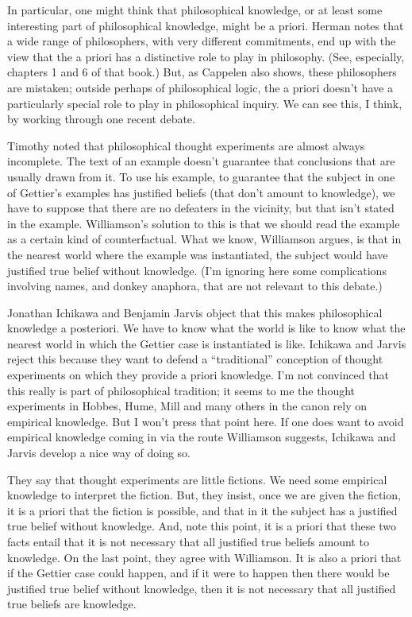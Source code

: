 In particular, one might think that philosophical knowledge, or at least some interesting part of philosophical knowledge, might be a priori. Herman  \citet{Cappelen2012} notes that a wide range of philosophers, with very different commitments, end up with the view that the a priori has a distinctive role to play in philosophy. (See, especially, chapters 1 and 6 of that book.) But, as Cappelen also shows, these philosophers are mistaken; outside perhaps of philosophical logic, the a priori doesn't have a particularly special role to play in philosophical inquiry. We can see this, I think, by working through one recent debate.

Timothy  \citet{Williamson2007-WILTPO-17} noted that philosophical thought experiments are almost always incomplete. The text of an example doesn't guarantee that conclusions that are usually drawn from it. To use his example, to guarantee that the subject in one of Gettier's examples has justified beliefs (that don't amount to knowledge), we have to suppose that there are no defeaters in the vicinity, but that isn't stated in the example. Williamson's solution to this is that we should read the example as a certain kind of counterfactual. What we know, Williamson argues, is that in the nearest world where the example was instantiated, the subject would have justified true belief without knowledge. (I'm ignoring here some complications involving names, and donkey anaphora, that are not relevant to this debate.)

Jonathan Ichikawa and Benjamin Jarvis  \citeyearpar{IchikawaJarvis2009} object that this makes philosophical knowledge a posteriori. We have to know what the world is like to know what the nearest world in which the Gettier case is instantiated is like. Ichikawa and Jarvis reject this because they want to defend a ``traditional'' conception of thought experiments on which they provide a priori knowledge. I'm not convinced that this really is part of philosophical tradition; it seems to me the thought experiments in Hobbes, Hume, Mill and many others in the canon rely on empirical knowledge. But I won't press that point here. If one does want to avoid empirical knowledge coming in via the route Williamson suggests, Ichikawa and Jarvis develop a nice way of doing so. 

They say that thought experiments are little fictions. We need some empirical knowledge to interpret the fiction. But, they insist, once we are given the fiction, it is a priori that the fiction is possible, and that in it the subject has a justified true belief without knowledge. And, note this point, it is a priori that these two facts entail that it is not necessary that all justified true beliefs amount to knowledge. On the last point, they agree with Williamson. It is also a priori that if the Gettier case could happen, and if it were to happen then there would be justified true belief without knowledge, then it is not necessary that all justified true beliefs are knowledge.

